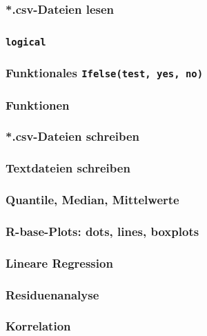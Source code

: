 \documentclass[paper=A4, pagesize, DIV=calc, smallheadings,
fontsize=11pt, expansion=false]{scrreprt}
\begin{document}
\subsubsection*{*.csv-Dateien lesen}

\subsubsection*{\texttt{logical}}

\subsubsection*{Funktionales \texttt{Ifelse(test, yes, no)}}

\subsubsection*{Funktionen}

\subsubsection*{*.csv-Dateien schreiben}

\subsubsection*{Textdateien schreiben}

\subsubsection*{Quantile, Median, Mittelwerte}


\subsubsection{R-base-Plots: dots, lines, boxplots}

\subsubsection{Lineare Regression}

\subsubsection{Residuenanalyse}

\subsubsection{Korrelation}
\end{document}
